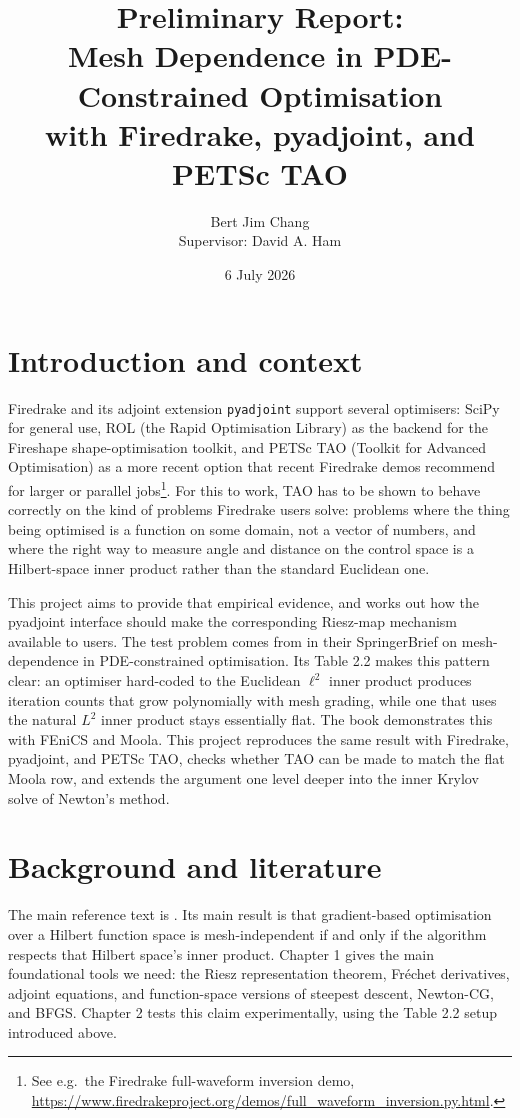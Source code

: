 \documentclass[a4paper,11pt]{article}
\title{\vspace{-2em}Preliminary Report:\\
Mesh Dependence in PDE-Constrained Optimisation\\
with Firedrake, pyadjoint, and PETSc TAO}
\author{Bert Jim Chang \\
Supervisor: David A. Ham}
\date{6 July 2026}
\begin{document}
\maketitle
\vspace{-1.5em}

\section{Introduction and context}

Firedrake and its adjoint extension \texttt{pyadjoint} support several optimisers: SciPy for general use, ROL (the Rapid Optimisation Library) as the backend for the Fireshape shape-optimisation toolkit, and PETSc TAO (Toolkit for Advanced Optimisation) as a more recent option that recent Firedrake demos recommend for larger or parallel jobs\footnote{See e.g.\ the Firedrake full-waveform inversion demo, \url{https://www.firedrakeproject.org/demos/full_waveform_inversion.py.html}.}. For this to work, TAO has to be shown to behave correctly on the kind of problems Firedrake users solve: problems where the thing being optimised is a function on some domain, not a vector of numbers, and where the right way to measure angle and distance on the control space is a Hilbert-space inner product rather than the standard Euclidean one.

This project aims to provide that empirical evidence, and works out how the pyadjoint interface should make the corresponding Riesz-map mechanism available to users. The test problem comes from \citet{shfp2017} in their SpringerBrief on mesh-dependence in PDE-constrained optimisation. Its Table 2.2 makes this pattern clear: an optimiser hard-coded to the Euclidean $\ell^{2}$ inner product produces iteration counts that grow polynomially with mesh grading, while one that uses the natural $L^{2}$ inner product stays essentially flat. The book demonstrates this with FEniCS and Moola. This project reproduces the same result with Firedrake, pyadjoint, and PETSc TAO, checks whether TAO can be made to match the flat Moola row, and extends the argument one level deeper into the inner Krylov solve of Newton's method.

\section{Background and literature}

The main reference text is \citet{shfp2017}. Its main result is that gradient-based optimisation over a Hilbert function space is mesh-independent if and only if the algorithm respects that Hilbert space's inner product. Chapter 1 gives the main foundational tools we need: the Riesz representation theorem, Fr\'echet derivatives, adjoint equations, and function-space versions of steepest descent, Newton-CG, and BFGS. Chapter 2 tests this claim experimentally, using the Table 2.2 setup introduced above.
\end{document}
